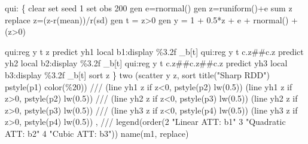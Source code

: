 \documentclass[
  letterpaper,
  DIV=11,
  numbers=noendperiod]{scrartcl}
\newenvironment{Shaded}{\begin{snugshade}}{\end{snugshade}}
\newcommand{\BaseNTok}[1]{\textcolor[rgb]{0.68,0.00,0.00}{#1}}
\newcommand{\CommentTok}[1]{\textcolor[rgb]{0.37,0.37,0.37}{#1}}
\newcommand{\DecValTok}[1]{\textcolor[rgb]{0.68,0.00,0.00}{#1}}
\newcommand{\FunctionTok}[1]{\textcolor[rgb]{0.28,0.35,0.67}{#1}}
\newcommand{\KeywordTok}[1]{\textcolor[rgb]{0.00,0.23,0.31}{#1}}
\newcommand{\NormalTok}[1]{\textcolor[rgb]{0.00,0.23,0.31}{#1}}
\newcommand{\StringTok}[1]{\textcolor[rgb]{0.13,0.47,0.30}{#1}}
\begin{document}
\begin{Shaded}
\begin{Highlighting}[]
 \KeywordTok{qui}\NormalTok{: \{}
\KeywordTok{clear}
\KeywordTok{set} \DecValTok{seed}\NormalTok{ 1}
\KeywordTok{set} \KeywordTok{obs}\NormalTok{ 200}
\KeywordTok{gen} \FunctionTok{e}\NormalTok{=rnormal()}
\KeywordTok{gen}\NormalTok{ z=runiform()+}\FunctionTok{e}
\KeywordTok{sum}\NormalTok{ z}
\KeywordTok{replace}\NormalTok{ z=(z{-}}\FunctionTok{r}\NormalTok{(}\KeywordTok{mean}\NormalTok{))/}\FunctionTok{r}\NormalTok{(}\FunctionTok{sd}\NormalTok{)}
\KeywordTok{gen}\NormalTok{ t = z\textgreater{}0}
\KeywordTok{gen} \FunctionTok{y}\NormalTok{ = 1 + 0.5*z + }\FunctionTok{e}\NormalTok{ + rnormal() + (z\textgreater{}0)}

\KeywordTok{qui}\NormalTok{:}\KeywordTok{reg} \FunctionTok{y}\NormalTok{ t z }
\KeywordTok{predict}\NormalTok{ yh1}
\KeywordTok{local}\NormalTok{ b1:}\KeywordTok{display}\NormalTok{ \%3.2f \_b[t]}
\KeywordTok{qui}\NormalTok{:}\KeywordTok{reg} \FunctionTok{y}\NormalTok{ t c.z\#\#c.z  }
\KeywordTok{predict}\NormalTok{ yh2}
\KeywordTok{local}\NormalTok{ b2:}\KeywordTok{display}\NormalTok{ \%3.2f \_b[t]}
\KeywordTok{qui}\NormalTok{:}\KeywordTok{reg} \FunctionTok{y}\NormalTok{ t c.z\#\#c.z\#\#c.z}
\KeywordTok{predict}\NormalTok{ yh3}
\KeywordTok{local}\NormalTok{ b3:}\KeywordTok{display}\NormalTok{ \%3.2f \_b[t]}
\KeywordTok{sort}\NormalTok{ z}
\NormalTok{\}}
\KeywordTok{two}\NormalTok{ (}\KeywordTok{scatter} \FunctionTok{y}\NormalTok{ z, }\KeywordTok{sort} \BaseNTok{title}\NormalTok{(}\StringTok{"Sharp RDD"}\NormalTok{) pstyle(p1) }\KeywordTok{color}\NormalTok{(\%20)) }\CommentTok{///}
\NormalTok{    (}\KeywordTok{line}\NormalTok{ yh1 z }\KeywordTok{if}\NormalTok{ z\textless{}0, pstyle(p2) lw(0.5)) (}\KeywordTok{line}\NormalTok{ yh1 z }\KeywordTok{if}\NormalTok{ z\textgreater{}0, pstyle(p2) lw(0.5)) }\CommentTok{///}
\NormalTok{    (}\KeywordTok{line}\NormalTok{ yh2 z }\KeywordTok{if}\NormalTok{ z\textless{}0, pstyle(p3) lw(0.5)) (}\KeywordTok{line}\NormalTok{ yh2 z }\KeywordTok{if}\NormalTok{ z\textgreater{}0, pstyle(p3) lw(0.5)) }\CommentTok{///}
\NormalTok{    (}\KeywordTok{line}\NormalTok{ yh3 z }\KeywordTok{if}\NormalTok{ z\textless{}0, pstyle(p4) lw(0.5)) (}\KeywordTok{line}\NormalTok{ yh3 z }\KeywordTok{if}\NormalTok{ z\textgreater{}0, pstyle(p4) lw(0.5)) , }\CommentTok{///}
    \BaseNTok{legend}\NormalTok{(}\KeywordTok{order}\NormalTok{(2 }\StringTok{"Linear ATT: \textasciigrave{}b1\textquotesingle{}"}\NormalTok{ 3 }\StringTok{"Quadratic ATT: \textasciigrave{}b2\textquotesingle{}"}\NormalTok{ 4 }\StringTok{"Cubic ATT: \textasciigrave{}b3\textquotesingle{}"}\NormalTok{)) }\BaseNTok{name}\NormalTok{(m1, }\KeywordTok{replace}\NormalTok{)}
\end{Highlighting}
\end{Shaded}
\end{document}
